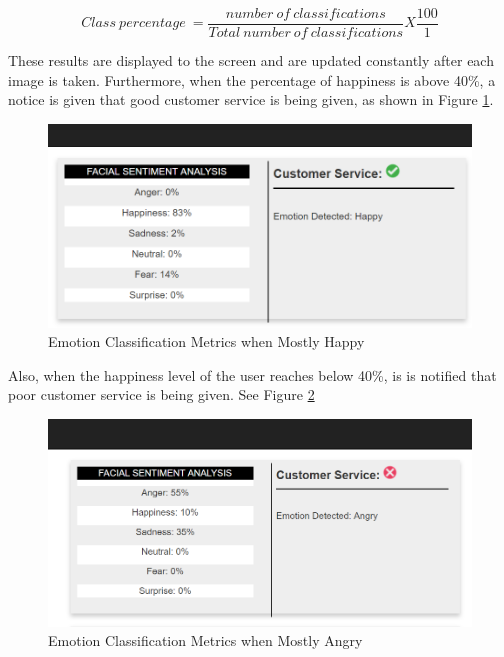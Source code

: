 \begin{equation}\label{eq:per}
Class\ percentage\ = 
\frac{
	number\ of\ classifications
}{
	Total\ number\ of\ classifications
}
X   
\frac{
	100
}{
	1
}
\end{equation}

These results are displayed to the screen and are updated constantly after each image is taken. Furthermore, when the percentage of happiness is above 40\%, a notice is given that good customer service is being given, as shown in Figure \ref{good}.

\begin{figure}[ht]
	\begin{center}
		\advance\leftskip-3cm
		\advance\rightskip-3cm
		\includegraphics[keepaspectratio=true,scale=0.6]{__resources/implementation/good.png}
		\caption{Emotion Classification Metrics when Mostly Happy}
		\label{good}
	\end{center}
\end{figure}


Also, when the happiness level of the user reaches below 40\%, is is notified that poor customer service is being given. See Figure \ref{bad}

\begin{figure}[ht]
	\begin{center}
		\advance\leftskip-3cm
		\advance\rightskip-3cm
		\includegraphics[keepaspectratio=true,scale=0.6]{__resources/implementation/bad.png}
		\caption{Emotion Classification Metrics when Mostly Angry}
		\label{bad}
	\end{center}
\end{figure}
\newpage

